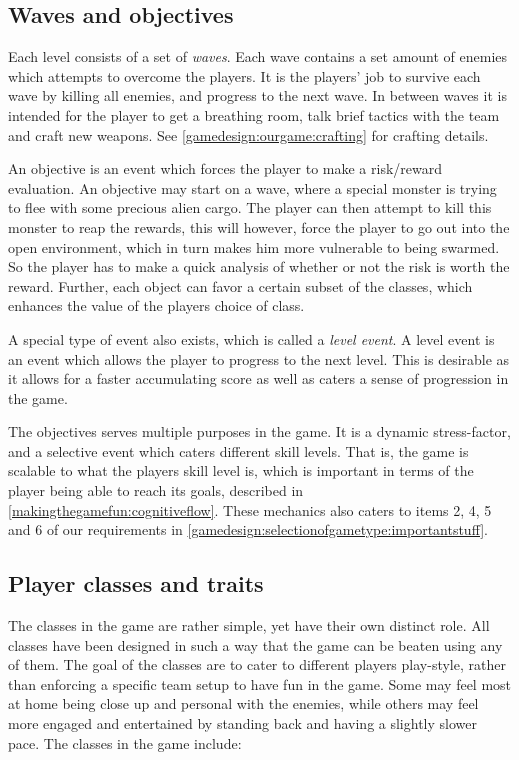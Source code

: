 \subsection{Waves and objectives}\label{gamedesign:ourgame:objectives}
Each level consists of a set of \emph{waves}. Each wave contains a set amount of enemies which attempts to overcome the players. It is the players' job to survive each wave by killing all enemies, and progress to the next wave. In between waves it is intended for the player to get a breathing room, talk brief tactics with the team and craft new weapons. See \ref{gamedesign:ourgame:crafting} for crafting details. 

An objective is an event which forces the player to make a risk/reward evaluation. 
An objective may start on a wave, where a special monster is trying to flee with some precious alien cargo. 
The player can then attempt to kill this monster to reap the rewards, this will however, force the player to go out into the open environment, which in turn makes him more vulnerable to being swarmed. So the player has to make a quick analysis of whether or not the risk is worth the reward.
Further, each object can favor a certain subset of the classes, which enhances the value of the players choice of class.

A special type of event also exists, which is called a \emph{level event}. A level event is an event which allows the player to progress to the next level. This is desirable as it allows for a faster accumulating score as well as caters a sense of progression in the game.

The objectives serves multiple purposes in the game. It is a dynamic stress-factor, and a selective event which caters different skill levels. 
That is, the game is scalable to what the players skill level is, which is important in terms of the player being able to reach its goals, described in \ref{makingthegamefun:cognitiveflow}. 
These mechanics also caters to items 2, 4, 5 and 6 of our requirements in \ref{gamedesign:selectionofgametype:importantstuff}.

\subsection{Player classes and traits}\label{gamedesign:ourgame:classes}
The classes in the game are rather simple, yet have their own distinct role.
All classes have been designed in such a way that the game can be beaten using any of them.
The goal of the classes are to cater to different players play-style, rather than enforcing a specific team setup to have fun in the game.
Some may feel most at home being close up and personal with the enemies, while others may feel more engaged and entertained by standing back and having a slightly slower pace.
The classes in the game include:

